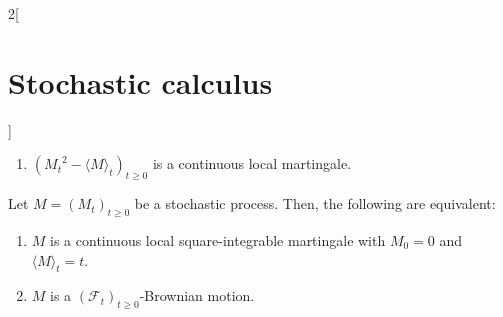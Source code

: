 \documentclass[../../../main_math.tex]{subfiles}
\begin{document}
\begin{multicols}{2}[\section{Stochastic calculus}]
\begin{proposition}
\begin{enumerate}
      \item ${({M_t}^2-{\langle M\rangle}_t)}_{t\geq 0}$ is a continuous local martingale.
    \end{enumerate}
  \end{proposition}
  \begin{theorem}
    Let $M={(M_t)}_{t\geq 0}$ be a stochastic process. Then, the following are equivalent:
    \begin{enumerate}
      \item $M$ is a continuous local square-integrable martingale with $M_0=0$ and ${\langle M\rangle}_t=t$.
      \item $M$ is a ${(\mathcal{F}_t)}_{t\geq 0}$-Brownian motion.
    \end{enumerate}
  \end{theorem}
\end{multicols}
\end{document}
